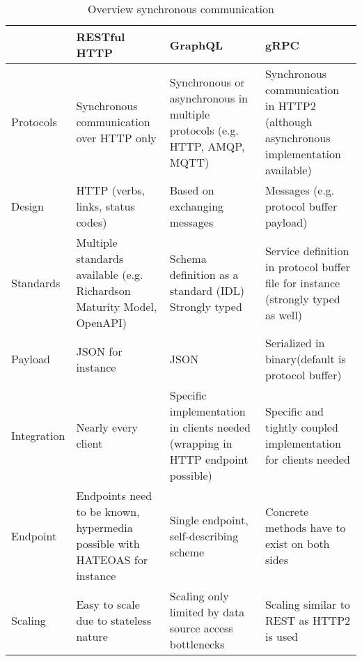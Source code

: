 \begin{table}[h!]
	\begin{tabularx}{\linewidth}{ |l| X | X | X | }
		\hline
		&
		RESTful HTTP & GraphQL                                                                   & gRPC                                                                                                                                                                      \\
		\hline
		Protocols   & Synchronous communication over HTTP only                                  & Synchronous or asynchronous in multiple protocols (e.g. HTTP, AMQP, MQTT)           & Synchronous communication in HTTP2 (although asynchronous implementation available) \\
		Design      & HTTP (verbs, links, status codes)                                         & Based on exchanging messages                                                        & Messages (e.g. protocol buffer payload)                                             \\
		Standards   & Multiple standards available (e.g. Richardson Maturity Model, OpenAPI)    & Schema definition as a standard (\ac{IDL}) Strongly typed                           & Service definition in protocol buffer file for instance (strongly typed as well)    \\
		Payload     & \ac{JSON} for instance                                                    & \ac{JSON}                                                                           & Serialized in binary(default is protocol buffer)                                    \\
		Integration & Nearly every client                                                       & Specific implementation in clients needed (wrapping in \ac{HTTP} endpoint possible) & Specific and tightly coupled implementation for clients needed                      \\
		Endpoint    & Endpoints need to be known, hypermedia possible with HATEOAS for instance & Single endpoint, self-describing scheme                                             & Concrete methods have to exist on both sides                                        \\
		Scaling     & Easy to scale due to stateless nature                                     & Scaling only limited by data source access bottlenecks                              & Scaling similar to REST as HTTP2 is used                                            \\
		\hline
	\end{tabularx}
	\caption{Overview synchronous communication \cite{Rocha.2019}}
	\label{tab:overviewSynchronousCommunication}
\end{table}

